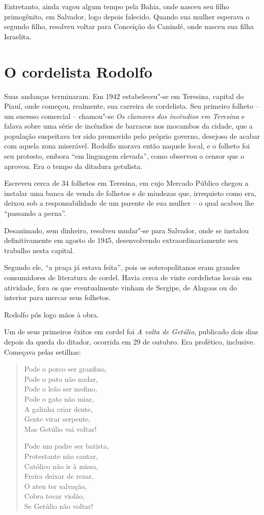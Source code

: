  Entretanto, ainda vagou algum tempo pela Bahia, onde nasceu seu filho
primogênito, em Salvador, logo depois falecido. Quando sua mulher
esperava o segundo filho, resolveu voltar para Conceição do Canindé,
onde nasceu sua filha Israelita. 

\section{O cordelista Rodolfo}

 Suas andanças terminaram. Em 1942 estabeleceu"-se em Teresina, capital
do Piauí, onde começou, realmente, sua carreira de cordelista. Seu
primeiro folheto -- um sucesso comercial -- chamou"-se
\textit{Os clamores dos incêndios em Teresina} e falava sobre uma série
de incêndios de barracos nos mocambos da cidade, que a população
suspeitava ter sido promovido pelo próprio governo, desejoso de acabar
com aquela zona miserável. Rodolfo morava então naquele local, e o
folheto foi seu protesto, embora ``em linguagem
elevada'', como observou o censor que o aprovou. Era o
tempo da ditadura getulista. 

 Escreveu cerca de 34 folhetos em Teresina, em cujo Mercado Público
chegou a instalar uma banca de venda de folhetos e de miudezas que,
irrequieto como era, deixou sob a responsabilidade de um parente de sua
mulher -- o qual acabou lhe ``passando a
perna''. 

 Desanimado, sem dinheiro, resolveu mudar"-se para Salvador, onde se
instalou definitivamente em agosto de 1945, desenvolvendo
extraordinariamente seu trabalho nesta capital. 

 Segundo ele, ``a praça já estava feita'',
pois os soteropolitanos eram grandes consumidores de literatura de
cordel. Havia cerca de vinte cordelistas locais em atividade, fora os
que eventualmente vinham de Sergipe, de Alagoas ou do interior para
mercar seus folhetos. 

 Rodolfo pôs logo mãos à obra. 

 Um de seus primeiros êxitos em cordel foi \textit{A volta de Getúlio},
publicado dois dias depois da queda do ditador, ocorrida em 29 de
outubro. Era profético, inclusive. Começava pelas setilhas: 

\begin{verse}
Pode o porco ser granfino, \\
Pode o pato não nadar, \\
Pode o leão ser mofino, \\
Pode o gato não miar, \\
A galinha criar dente, \\
Gente virar serpente, \\
Mas Getúlio vai voltar!

Pode um padre ser batista, \\
Protestante não cantar, \\
Católico não ir à missa, \\
Freira deixar de rezar, \\
O ateu ter salvação, \\
Cobra tocar violão, \\
Se Getúlio não voltar!
\end{verse}

